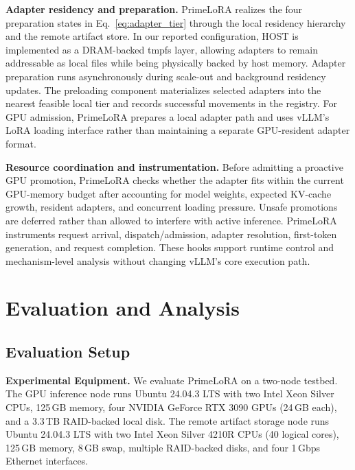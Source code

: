 \documentclass[lettersize,journal]{IEEEtran}
\begin{document}
\textbf{Adapter residency and preparation.}
PrimeLoRA realizes the four preparation states in Eq.~\ref{eq:adapter_tier} through the local residency hierarchy and the remote artifact store. In our reported configuration, HOST is implemented as a DRAM-backed tmpfs layer, allowing adapters to remain addressable as local files while being physically backed by host memory. Adapter preparation runs asynchronously during scale-out and background residency updates. The preloading component materializes selected adapters into the nearest feasible local tier and records successful movements in the registry. For GPU admission, PrimeLoRA prepares a local adapter path and uses vLLM's LoRA loading interface rather than maintaining a separate GPU-resident adapter format.

\textbf{Resource coordination and instrumentation.}
Before admitting a proactive GPU promotion, PrimeLoRA checks whether the adapter fits within the current GPU-memory budget after accounting for model weights, expected KV-cache growth, resident adapters, and concurrent loading pressure. Unsafe promotions are deferred rather than allowed to interfere with active inference. PrimeLoRA instruments request arrival, dispatch/admission, adapter resolution, first-token generation, and request completion. These hooks support runtime control and mechanism-level analysis without changing vLLM's core execution path.

\section{Evaluation and Analysis}
\label{sec:evaluation}

\subsection{Evaluation Setup}

\textbf{Experimental Equipment.}
We evaluate PrimeLoRA on a two-node testbed. The GPU inference node runs Ubuntu 24.04.3 LTS with two Intel Xeon Silver CPUs, 125\,GB memory, four NVIDIA GeForce RTX 3090 GPUs (24\,GB each), and a 3.3\,TB RAID-backed local disk. The remote artifact storage node runs Ubuntu 24.04.3 LTS with two Intel Xeon Silver 4210R CPUs (40 logical cores), 125\,GB memory, 8\,GB swap, multiple RAID-backed disks, and four 1\,Gbps Ethernet interfaces.
\end{document}
